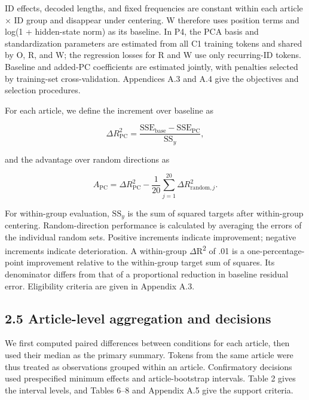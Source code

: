 ID effects, decoded lengths, and fixed frequencies are constant within each article × ID group and disappear under centering. W therefore uses position terms and log(1 + hidden-state norm) as its baseline. In P4, the PCA basis and standardization parameters are estimated from all C1 training tokens and shared by O, R, and W; the regression losses for R and W use only recurring-ID tokens. Baseline and added-PC coefficients are estimated jointly, with penalties selected by training-set cross-validation. Appendices A.3 and A.4 give the objectives and selection procedures.

For each article, we define the increment over baseline as

\[
\Delta R^2_{\mathrm{PC}}
=\frac{\mathrm{SSE}_{\mathrm{base}}-\mathrm{SSE}_{\mathrm{PC}}}{\mathrm{SS}_{y}},
\]

and the advantage over random directions as

\[
A_{\mathrm{PC}}
=\Delta R^2_{\mathrm{PC}}
-\frac{1}{20}\sum_{j=1}^{20}\Delta R^2_{\mathrm{random},j}.
\]

For within-group evaluation, \(\mathrm{SS}_{y}\) is the sum of squared targets after within-group centering. Random-direction performance is calculated by averaging the errors of the individual random sets. Positive increments indicate improvement; negative increments indicate deterioration. A within-group {\(\Delta\)R\textsuperscript{2}} of .01 is a one-percentage-point improvement relative to the within-group target sum of squares. Its denominator differs from that of a proportional reduction in baseline residual error. Eligibility criteria are given in Appendix A.3.

\FloatBarrier

\subsection{2.5 Article-level aggregation and decisions}\label{article-level-aggregation-and-decisions}

We first computed paired differences between conditions for each article, then used their median as the primary summary. Tokens from the same article were thus treated as observations grouped within an article. Confirmatory decisions used prespecified minimum effects and article-bootstrap intervals. Table 2 gives the interval levels, and Tables 6--8 and Appendix A.5 give the support criteria.

